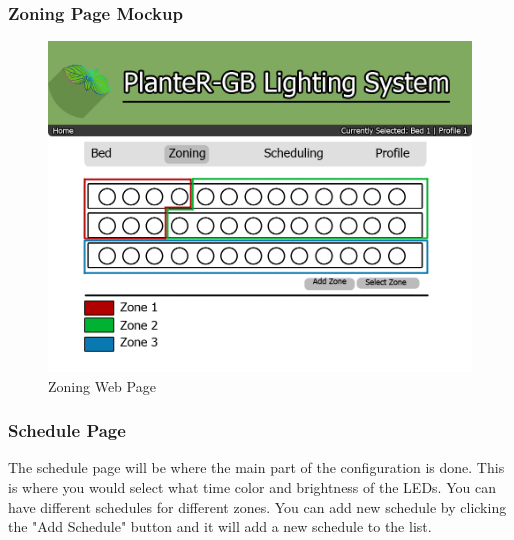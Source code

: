 \documentclass[onecolumn, draftclsnofoot,10pt, compsoc]{IEEEtran}
\begin{document}
			            \subsubsection{Zoning Page Mockup}
			            \begin{center}
			                \begin{figure}[H]
			                    \includegraphics[width=\linewidth]{web_design/ZoningPage.png}
			                    \caption{Zoning Web Page}
			                    \label{fig:Zoning Page}
			                \end{figure}
			            \end{center}
			            \subsubsection{Schedule Page}
			            The schedule page will be where the main part of the configuration is done.
			            This is where you would select what time color and brightness of the LEDs.
			            You can have different schedules for different zones. You can add new schedule
			            by clicking the "Add Schedule" button and it will add a new schedule to the
			            list.
\end{document}
